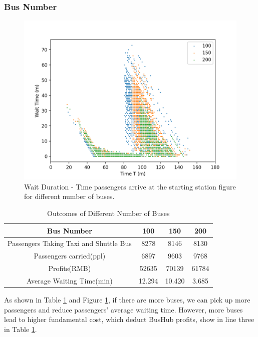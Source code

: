 \documentclass{mcmthesis}
\begin{document}
\subsubsection{Bus Number}
\begin{figure}[htbp]
    \centering
    \includegraphics{figures/waittime.png}
    \caption{Wait Duration - Time passengers arrive at the starting station figure for different number of buses.}
    \label{fig:waittime}
\end{figure}

\begin{table}[h]
    \centering
    \caption{Outcomes of Different Number of Buses}
    \label{tab:outc}
    \linespread{1.5}
    \begin{tabular}{cccc} 
\toprule
Bus Number & 100 & 150 & 200\\
\midrule
Passengers Taking Taxi and Shuttle Bus & 8278 & 8146 & 8130 \\
Passengers carried(ppl) & 6897 & 9603 & 9768 \\
Profits(RMB) & 52635 & 70139 & 61784 \\ 
Average Waiting Time(min) & 12.294 & 10.420 & 3.685 \\
\bottomrule 
\end{tabular}
\end{table}

As shown in Table \ref{tab:outc} and Figure \ref{fig:waittime}, if there are more buses, we can pick up more passengers and reduce passengers' average waiting time. However, more buses lead to higher fundamental cost, which deduct BusHub profits, show in line three in Table \ref{tab:outc}.
\end{document}
